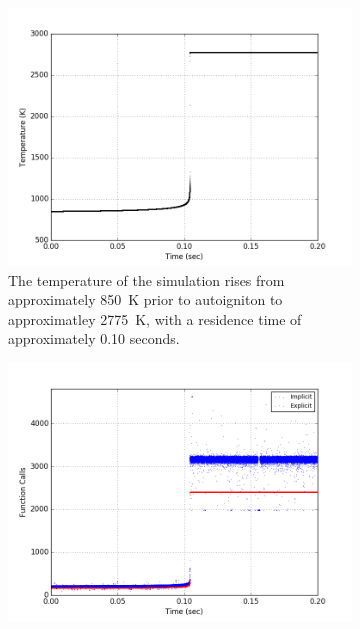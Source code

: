 \documentclass[12pt]{ussci}
\begin{document}
\begin{figure}[htbp]
    \centering
    \begin{subfigure}{0.42\textwidth}
        \includegraphics[width=\linewidth]{Autoignition_Temperature_1e-06_08_03.png}
        \caption{The temperature of the simulation rises from approximately \SI{850}{\kelvin} prior to autoigniton to approximatley \SI{2775}{\kelvin}, with a residence time of approximately 0.10 seconds.}
        \label{fig:tempcurveH2COAuto}
    \end{subfigure}
    \hfill
    \begin{subfigure}{0.42\textwidth}
        \includegraphics[width=\linewidth]{Autoignition_Function_Work_1e-06_08_17.png}

\end{subfigure}
\end{figure}
\end{document}
